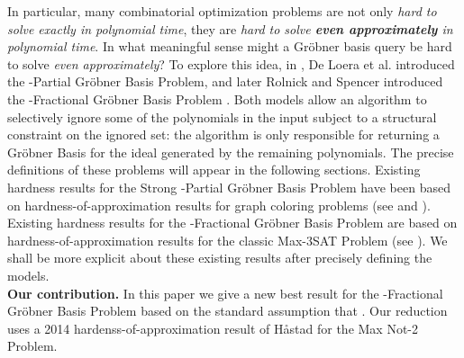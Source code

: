 \documentclass{article}
\begin{document}
In particular, many combinatorial optimization problems are not only \textit{hard to solve exactly in polynomial time}, they are \textit{hard to solve \textbf{even approximately} in polynomial time}. In what meaningful sense might a Gr\"{o}bner basis query be hard to solve \textit{even approximately}? To explore this idea, in \cite{deloera}, De Loera et al. introduced the -Partial Gr\"{o}bner Basis Problem, and later Rolnick and Spencer introduced the -Fractional Gr\"{o}bner Basis Problem \cite{RS}. Both models allow an algorithm to selectively ignore some of the polynomials in the input subject to a structural constraint on the ignored set: the algorithm is only responsible for returning a Gr\"{o}bner Basis for the ideal generated by  the remaining polynomials. The precise definitions of these problems will appear in the following sections. Existing hardness results for the Strong -Partial Gr\"{o}bner Basis Problem have been based on hardness-of-approximation results for graph coloring problems (see \citep{deloera} and \citep{RS}). Existing hardness results for the -Fractional Gr\"{o}bner Basis Problem are based on hardness-of-approximation results for the classic Max-3SAT Problem (see \citep{RS}). We shall be more explicit about these existing results after precisely defining the models.\\







 



\noindent \textbf{Our contribution.} 
In this paper we give a new best result for the -Fractional Gr\"{o}bner Basis Problem based on the standard assumption that . Our reduction uses a 2014 hardenss-of-approximation result of H{\aa}stad for the Max Not-2 Problem.
\end{document}
